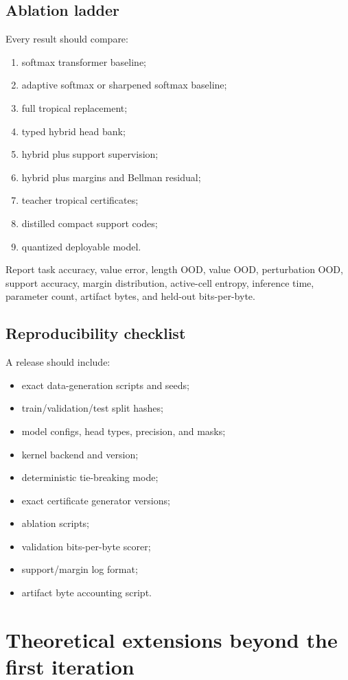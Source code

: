 \documentclass[11pt]{article}
\begin{document}
\subsection{Ablation ladder}

Every result should compare:
\begin{enumerate}
\item softmax transformer baseline;
\item adaptive softmax or sharpened softmax baseline;
\item full tropical replacement;
\item typed hybrid head bank;
\item hybrid plus support supervision;
\item hybrid plus margins and Bellman residual;
\item teacher tropical certificates;
\item distilled compact support codes;
\item quantized deployable model.
\end{enumerate}
Report task accuracy, value error, length OOD, value OOD, perturbation OOD, support accuracy, margin distribution, active-cell entropy, inference time, parameter count, artifact bytes, and held-out bits-per-byte.

\subsection{Reproducibility checklist}

A release should include:
\begin{itemize}
\item exact data-generation scripts and seeds;
\item train/validation/test split hashes;
\item model configs, head types, precision, and masks;
\item kernel backend and version;
\item deterministic tie-breaking mode;
\item exact certificate generator versions;
\item ablation scripts;
\item validation bits-per-byte scorer;
\item support/margin log format;
\item artifact byte accounting script.
\end{itemize}

\section{Theoretical extensions beyond the first iteration}
\end{document}
